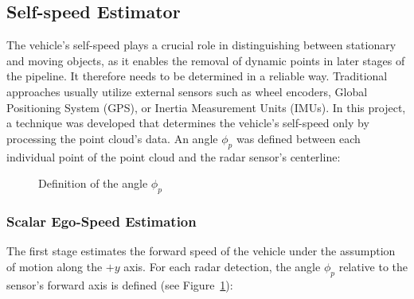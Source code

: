 \subsection{Self-speed Estimator}
\label{sec:self-speed_estimator}
The vehicle's self-speed plays a crucial role in distinguishing between stationary and moving objects, as it enables the removal of dynamic points in later stages of the pipeline. 
It therefore needs to be determined in a reliable way.
Traditional approaches usually utilize external sensors such as wheel encoders, Global Positioning System (GPS), or Inertia Measurement Units (IMUs).
In this project, a technique was developed that determines the vehicle's self-speed only by processing the point cloud's data.
An angle $\phi_{p}$ was defined between each individual point of the point cloud and the radar sensor's centerline:
\par
\begin{figure}[!htbp]
    \centering
    \caption{Definition of the angle $\phi_{p}$}
    \label{fig:def_angle_phi}
\end{figure}
\FloatBarrier\noindent

\subsubsection*{Scalar Ego-Speed Estimation}
The first stage estimates the forward speed of the vehicle under the assumption of motion along the $+y$ axis. 
For each radar detection, the angle $\phi_p$ relative to the sensor's forward axis is defined (see Figure~\ref{fig:def_angle_phi}):  

